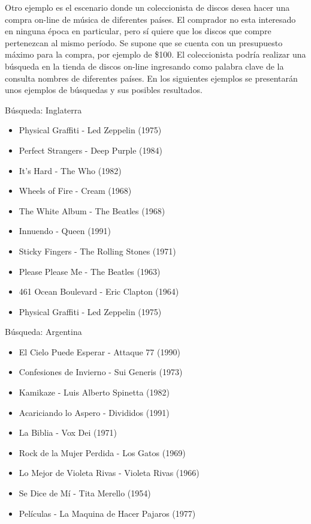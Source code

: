 Otro ejemplo es el escenario donde un coleccionista de discos desea hacer una compra on-line de música de diferentes países. El comprador no esta interesado en ninguna época en particular, pero sí quiere que los discos que compre pertenezcan al mismo período. Se supone que se cuenta con un presupuesto máximo para la compra, por ejemplo de \$100. El coleccionista podría realizar una búsqueda en la tienda de discos on-line ingresando como palabra clave de la consulta nombres de diferentes países. En los siguientes ejemplos se presentarán unos ejemplos de búsquedas y sus posibles resultados.

\begin{mybox}{Búsqueda: Inglaterra}
\begin{itemize}
	\item {\scriptsize Physical Graffiti - Led Zeppelin (1975)}
	\item {\scriptsize Perfect Strangers - Deep Purple (1984)}
	\item {\scriptsize It's Hard - The Who  (1982)}
	\item {\scriptsize Wheels of Fire - Cream (1968)}
	\item {\scriptsize The White Album - The Beatles (1968)}
	\item {\scriptsize Innuendo - Queen (1991)}
	\item {\scriptsize Sticky Fingers - The Rolling Stones (1971)}
	\item {\scriptsize Please Please Me - The Beatles (1963)}
	\item {\scriptsize 461 Ocean Boulevard - Eric Clapton (1964)}
	\item {\scriptsize Physical Graffiti - Led Zeppelin (1975)}
\end{itemize}
\end{mybox}

\begin{mybox}{Búsqueda: Argentina}
\begin{itemize}
	\item {\scriptsize El Cielo Puede Esperar - Attaque 77 (1990)}
	\item {\scriptsize Confesiones de Invierno - Sui Generis (1973)}
	\item {\scriptsize Kamikaze - Luis Alberto Spinetta (1982)}
	\item {\scriptsize Acariciando lo Aspero - Divididos (1991)}
	\item {\scriptsize La Biblia - Vox Dei (1971)}
	\item {\scriptsize Rock de la Mujer Perdida - Los Gatos (1969)}
	\item {\scriptsize Lo Mejor de Violeta Rivas - Violeta Rivas (1966)}
	\item {\scriptsize Se Dice de Mí - Tita Merello (1954)}
	\item {\scriptsize Películas - La Maquina de Hacer Pajaros (1977)}
\end{itemize}
\end{mybox}

